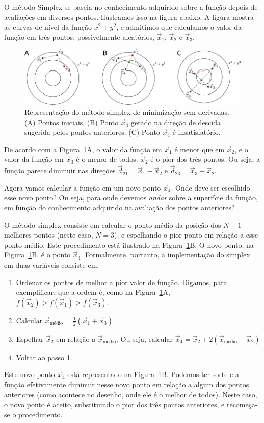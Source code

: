 \documentclass[10pt,a4paper,ssfamily]{exam}
\begin{document}
O método Simplex se baseia no conhecimento adquirido sobre a função
depois de avaliações em diversos pontos. Ilustramos isso na figura
abaixo. A figura mostra as curvas de nível da função $x^2+y^2$, e
admitimos que calculamos o valor da função em três pontos, possivelmente
aleatórios, $\vec{x}_1$, $\vec{x}_2$ e $\vec{x}_3$.
\begin{figure}[htbp]\centering
\includegraphics{./simplex.pdf}
\caption{Representação do método simplex de minimização sem derivadas.
(A) Pontos iniciais. (B) Ponto $\vec{x}_4$ gerado na direção de descida
sugerida pelos pontos anteriores. (C) Ponto $\vec{x}_4$ é
insatisfatório.}\label{simplex}
\end{figure}
De acordo com a Figura~\ref{simplex}A, o valor da função em $\vec{x}_1$ é
menor que em $\vec{x}_2$, e o valor da função em $\vec{x}_3$ é o menor
de todos. $\vec{x}_2$ é o pior dos três pontos. 
Ou seja, a função parece diminuir nas direções $\vec{d}_{21}=\vec{x}_1-\vec{x}_2$ e
$\vec{d}_{23}=\vec{x}_3-\vec{x}_2$.

Agora vamos calcular a função em um novo ponto $\vec{x}_4$. Onde deve
ser escolhido esse novo ponto? Ou seja, para onde devemos {\it andar}
sobre a superfície da função, em função do conhecimento adquirido na
avaliação dos pontos anteriores? 

O método simplex consiste em calcular o ponto médio da posição dos $N-1$ melhores
pontos (neste caso, $N=3$), e espelhando o pior ponto em relação a esse
ponto médio. Este procedimento está ilustrado na Figura~\ref{simplex}B.
O novo ponto, na Figura~\ref{simplex}B, é o ponto $\vec{x}_4$.
Formalmente, portanto, a implementação do simplex em duas variáveis
consiste em:
\begin{enumerate}
\item
Ordenar os pontos de melhor a pior valor de função. Digamos, para
exemplificar, que a ordem é, como na Figura~\ref{simplex}A, 
$f(\vec{x}_2) > f(\vec{x}_1) > f(\vec{x}_3)$.
\item
Calcular $\vec{x}_{\text{médio}} = \frac{1}{2}\left(\vec{x}_1+\vec{x}_3\right)$
\item
Espelhar $\vec{x}_2$ em relação a $\vec{x}_\text{médio}$. Ou seja,
calcular
$\vec{x}_4=\vec{x}_2 + 2(\vec{x}_\text{médio}-\vec{x}_2)$
\item
Voltar ao passo 1.
\end{enumerate}
Este novo ponto $\vec{x}_4$ está representado na Figura~\ref{simplex}B.
Podemos ter sorte e a função efetivamente diminuir nesse novo ponto em
relação a algum dos pontos anteriores (como acontece no desenho, onde
ele é o melhor de todos). Neste caso, o novo ponto é aceito,
substituindo o pior dos três pontos anteriores, e recomeça-se o
procedimento.
\end{document}
